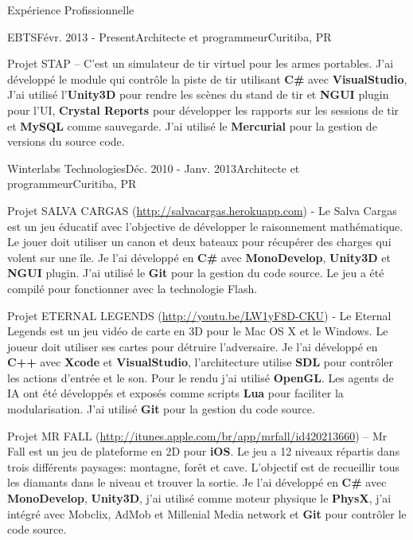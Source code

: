 \documentclass{resume}
\begin{document}
  \begin{rSection}{Expérience Profissionnelle}
    \begin{rSubsection}{EBTS}{Févr. 2013 - Present}{Architecte et programmeur}{Curitiba, PR}
    \item Projet STAP – C'est un simulateur de tir virtuel pour les armes portables. J'ai développé le module qui contrôle la piste de tir utilisant \textbf{C\#} avec \textbf{VisualStudio}, J'ai utilisé l'\textbf{Unity3D} pour rendre les scènes du stand de tir et \textbf{NGUI} plugin pour l'UI, \textbf{Crystal Reports} pour développer les rapports sur les sessions de tir et \textbf{MySQL} comme sauvegarde.  J'ai utilisé le \textbf{Mercurial} pour la gestion de versions du source code.
    \end{rSubsection}
    \begin{rSubsection}{Winterlabs Technologies}{Déc. 2010 - Janv. 2013}{Architecte et programmeur}{Curitiba, PR}
    \item Projet SALVA CARGAS (\url{http://salvacargas.herokuapp.com}) - Le Salva Cargas est un jeu éducatif avec l'objective de développer le raisonnement mathématique. Le jouer doit utiliser un canon et deux bateaux pour récupérer des charges qui volent sur une île. Je l'ai développé en \textbf{C\#} avec \textbf{MonoDevelop}, \textbf{Unity3D} et \textbf{NGUI} plugin. J'ai utilisé le \textbf{Git} pour la gestion du code source. Le jeu a été compilé pour fonctionner avec la technologie Flash. \\
    \item Projet ETERNAL LEGENDS (\url{http://youtu.be/LW1yF8D-CKU}) - Le Eternal Legends est un jeu vidéo de carte en 3D pour le Mac OS X et le Windows. Le joueur doit utiliser ses cartes pour détruire l'adversaire. Je l’ai développé en \textbf{C++} avec \textbf{Xcode} et \textbf{VisualStudio}, l’architecture utilise \textbf{SDL} pour contrôler les actions d’entrée et le son. Pour le rendu j’ai utilisé \textbf{OpenGL}. Les agents de IA ont été développés et exposés comme scripts \textbf{Lua} pour faciliter la modularisation. J’ai utilisé \textbf{Git} pour la gestion du code source. \\
    \item Projet MR FALL (\url{http://itunes.apple.com/br/app/mrfall/id420213660}) – Mr Fall est un jeu de plateforme en 2D pour \textbf{iOS}. Le jeu a 12 niveaux répartis dans trois différents paysages: montagne, forêt et cave. L'objectif est de recueillir tous les diamants dans le niveau et trouver la sortie. Je l’ai développé en \textbf{C\#} avec \textbf{MonoDevelop}, \textbf{Unity3D}, j'ai utilisé comme moteur physique le \textbf{PhysX}, j'ai intégré avec Mobclix, AdMob et Millenial Media network et \textbf{Git} pour  contrôler le code source. \\

\end{rSubsection}
\end{rSection}
\end{document}

